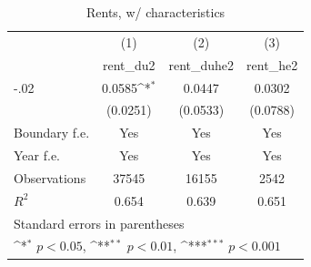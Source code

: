 \begin{table}[htbp]\centering
\def\sym#1{\ifmmode^{#1}\else\(^{#1}\)\fi}
\caption{Rents, w/ characteristics}
\begin{tabular}{l*{3}{c}}
\hline\hline
                    &\multicolumn{1}{c}{(1)}&\multicolumn{1}{c}{(2)}&\multicolumn{1}{c}{(3)}\\
                    &\multicolumn{1}{c}{rent\_du2}&\multicolumn{1}{c}{rent\_duhe2}&\multicolumn{1}{c}{rent\_he2}\\
\hline
-.02                &      0.0585\sym{*}  &      0.0447         &      0.0302         \\
                    &    (0.0251)         &    (0.0533)         &    (0.0788)         \\
[1em]
Boundary f.e.       &         Yes         &         Yes         &         Yes         \\
[1em]
Year f.e.           &         Yes         &         Yes         &         Yes         \\
\hline
Observations        &       37545         &       16155         &        2542         \\
\(R^{2}\)           &       0.654         &       0.639         &       0.651         \\
\hline\hline
\multicolumn{4}{l}{\footnotesize Standard errors in parentheses}\\
\multicolumn{4}{l}{\footnotesize \sym{*} \(p<0.05\), \sym{**} \(p<0.01\), \sym{***} \(p<0.001\)}\\
\end{tabular}
\end{table}

